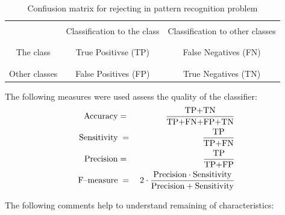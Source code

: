 \documentclass{mini}
\begin{document}
\begin{table}[H]
\vspace{-9pt}
\centering
\begin{tabular}{|c|c|c|}
\hline
  & & \vspace{-6pt}\\
  & \hspace{12pt}Classification to the class\hspace{12pt} & \hspace{3pt}Classification to other classes\hspace{3pt} \\
  & & \vspace{-6pt}\\
\hline 
  & & \vspace{-6pt}\\
  The class & True Positivse (TP) & False Negatives (FN) \\
  & & \vspace{-6pt}\\
\hline
  & & \vspace{-6pt}\\
  \hspace{3pt}Other classes\hspace{3pt} & False Positives (FP) &  True Negatives (TN)\vspace{3pt}\\
\hline
\end{tabular}
\vspace{9pt}
\caption{Confiusion matrix for rejecting in pattern recognition problem}
\label{tab:conf_matrix}
\end{table}

The following measures were used assess the quality of the classifier:
\begin{eqnarray}
  \textnormal{Accuracy}    & = &   \displaystyle\frac{\textnormal{TP+TN}}{\textnormal{TP+FN+FP+TN}}\nonumber\\
  \textnormal{Sensitivity} &\;=\;& \displaystyle\frac{\textnormal{TP}}{\textnormal{TP+FN}}\nonumber\\
  \textnormal{Precision}   & = &   \displaystyle\frac{\textnormal{TP}}{\textnormal{TP+FP}}\nonumber\\
  \textnormal{F--measure}  &\;=\;& 2\cdot\frac{\mbox{Precision}\cdot\mbox{Sensitivity}}{\mbox{Precision}+\mbox{Sensitivity}}
\end{eqnarray}

The following comments help to understand remaining of characteristics:
\end{document}
